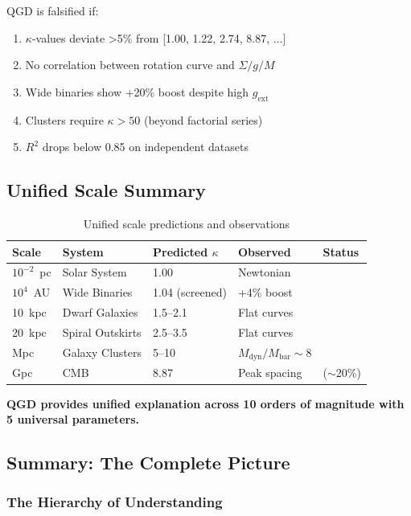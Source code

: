 \documentclass[11pt,a4paper]{article}
\theoremstyle{definition}
\theoremstyle{remark}
\begin{document}
	QGD is falsified if:
	\begin{enumerate}
		\item $\kappa$-values deviate >5\% from [1.00, 1.22, 2.74, 8.87, $\ldots$]
		\item No correlation between rotation curve and $\Sigma/g/M$
		\item Wide binaries show +20\% boost despite high $g_{\text{ext}}$
		\item Clusters require $\kappa > 50$ (beyond factorial series)
		\item $R^2$ drops below 0.85 on independent datasets
	\end{enumerate}
	
	\subsection{Unified Scale Summary}
	
	\begin{table}[ht]
		\centering
		\caption{Unified scale predictions and observations}
		\label{tab:unified_scales}
		\begin{tabular}{@{}lllll@{}}
			\toprule
			Scale & System & Predicted $\kappa$ & Observed & Status \\
			\midrule
			$10^{-2}$~pc & Solar System & 1.00 & Newtonian & \checkmark \\
			$10^4$~AU & Wide Binaries & 1.04 (screened) & +4\% boost & \checkmark \\
			10~kpc & Dwarf Galaxies & 1.5--2.1 & Flat curves & \checkmark \\
			20~kpc & Spiral Outskirts & 2.5--3.5 & Flat curves & \checkmark \\
			Mpc & Galaxy Clusters & 5--10 & $M_{\text{dyn}}/M_{\text{bar}} \sim 8$ & \checkmark \\
			Gpc & CMB & 8.87 & Peak spacing & \checkmark ($\sim$20\%) \\
			\bottomrule
		\end{tabular}
	\end{table}
	
	\textbf{QGD provides unified explanation across 10 orders of magnitude with 5 universal parameters.}
	
	\subsection{Summary: The Complete Picture}
	
	\subsubsection{The Hierarchy of Understanding}
	
\end{document}
